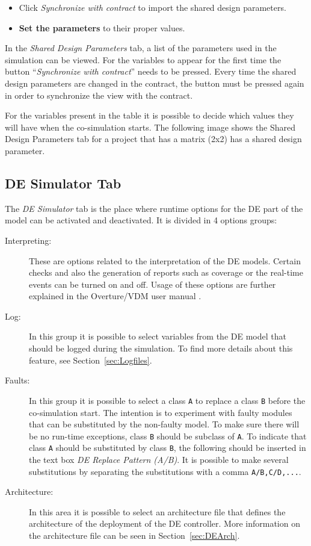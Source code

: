 \documentclass{crescendorepchap}
\begin{document}
\begin{itemize}
\item
  Click \emph{Synchronize with contract} to import the shared design
  parameters.
\item
  \textbf{Set the parameters} to their proper values.
\end{itemize}

In the \emph{Shared Design Parameters} tab, a list of the parameters used in
the simulation can be viewed. For the variables to appear for the first
time the button ``\emph{Synchronize with contract}'' needs to be pressed.
Every time the shared design parameters are changed in the contract, the
button must be pressed again in order to synchronize the view with the
contract.

For the variables present in the table
it is possible to decide which values they will have when the
co-simulation starts. The following image shows the Shared Design
Parameters tab for a project that has a matrix (2x2) has a shared design
parameter.

\subsection{DE Simulator Tab}

The \emph{DE Simulator} tab is the place where runtime options for the DE part of
the model can be activated and deactivated. It is divided in 4 options
groups:

\begin{description}
\item[Interpreting:] These are options related to the interpretation of
  the DE models. Certain checks and also the generation of reports such
  as coverage or the real-time events can be turned on and off. Usage of these
  options are further explained in the Overture/VDM user manual \cite{Larsen&13a}.
\item[Log:] In this group it is possible to select variables from the DE
  model that should be logged during the simulation. To find more
  details about this feature, see Section~\ref{sec:Logfiles}.
\item[Faults:] In this group it is possible to
  select a class \texttt{A} to replace a class \texttt{B} before the co-simulation start. The
  intention is to experiment with faulty modules that can be substituted
  by the non-faulty model. To make sure there will be no run-time
  exceptions, class \texttt{B} should be subclass of \texttt{A}. To indicate that class \texttt{A}
  should be substituted by class \texttt{B}, the following should be inserted in
  the text box \emph{DE Replace Pattern (A/B)}. It is possible to make several
  substitutions by separating the substitutions with a comma
  \texttt{A/B,C/D,...}.
\item[Architecture:] In this area it is
  possible to select an architecture file that defines the architecture
  of the deployment of the DE controller. More information on the
  architecture file can be seen in Section~\ref{sec:DEArch}.
\end{description}
\end{document}

